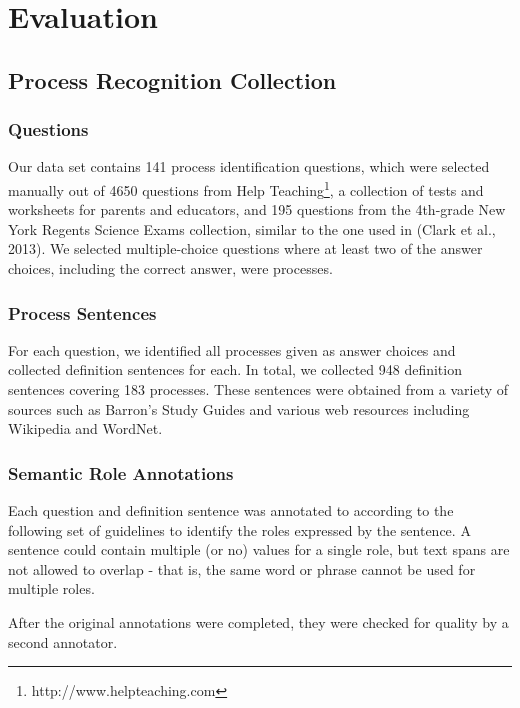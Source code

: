 \section{Evaluation}

\subsection{Process Recognition Collection}

\subsubsection{Questions}

Our data set contains 141 process identification questions, which were selected manually out of 4650 questions from Help Teaching\footnote{http://www.helpteaching.com}, a collection of tests and worksheets for parents and educators, and 195 questions from the 4th-grade New York Regents Science Exams collection, similar to the one used in (Clark et al., 2013). We selected multiple-choice questions where at least two of the answer choices, including the correct answer, were processes.

\subsubsection{Process Sentences}

For each question, we identified all processes given as answer choices and collected definition sentences for each. In total, we collected 948 definition sentences covering 183 processes. These sentences were obtained from a variety of sources such as Barron's Study Guides and various web resources including Wikipedia and WordNet.  

\subsubsection{Semantic Role Annotations}

Each question and definition sentence was annotated to according to the following set of guidelines to identify the roles expressed by the sentence. A sentence could contain multiple (or no) values for a single role, but text spans are not allowed to overlap - that is, the same word or phrase cannot be used for multiple roles.

After the original annotations were completed, they were checked for quality by a second annotator.



